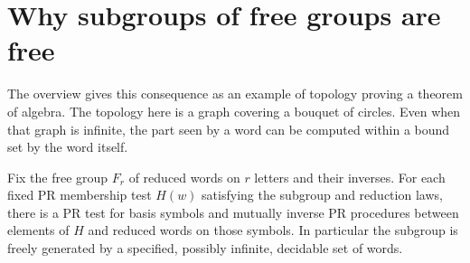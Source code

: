 \section{Why subgroups of free groups are free}\label{sec:schreier}
The overview gives this consequence as an example of topology proving a theorem of algebra. The topology here is a graph covering a bouquet of circles. Even when that graph is infinite, the part seen by a word can be computed within a bound set by the word itself.

\begin{theorem}\label{thm:schreier}\label{idx-schreier4}
Fix the free group $F_r$ of reduced words on $r$ letters and their inverses. For each fixed PR membership test $H(w)$ satisfying the subgroup and reduction laws, there is a PR test for basis symbols and mutually inverse PR procedures between elements of $H$ and reduced words on those symbols. In particular the subgroup is freely generated by a specified, possibly infinite, decidable set of words.
\end{theorem}
